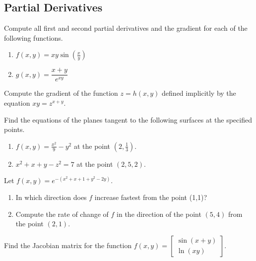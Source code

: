 \setcounter{subsection}{-1}
\subsection{Partial Derivatives}

\BEN

\item

Compute all first and second partial derivatives and the gradient
for each of the following functions.
\begin{enumerate}
 \item $f(x,y) = xy\sin(\frac{x}{y})$
 \item $g(x,y) = \dfrac{x+y}{e^{xy}}$
\end{enumerate}

\item

Compute the gradient of the function $z = h(x, y)$ defined implicitly by the
equation $xy = z^{x+y}$.

\item

Find the equations of the planes tangent to the following surfaces
at the specified points.
\begin{enumerate}
 \item $f(x,y) = \frac{x^2}{9} - y^2$ at the point $(2, \frac{1}{3})$.
 \item $x^2 + x + y - z^2 = 7$ at the point $(2, 5, 2)$.
\end{enumerate}

\item

Let $f(x,y) = e^{-(x^2+x+1+y^2-2y)}$.
\begin{enumerate}
 \item In which direction does $f$ increase fastest from the point
  (1,1)?
 \item Compute the rate of change of $f$ in the direction of the
  point $(5,4)$ from the point $(2,1)$.
\end{enumerate}

\item

Find the Jacobian matrix for the function
$f(x,y) = \begin{bmatrix} \sin(x+y) \\ \ln(xy) \end{bmatrix}$.


